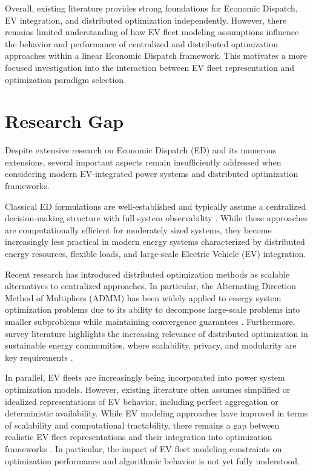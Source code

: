 \documentclass[12pt, a4paper]{article}
\begin{document}
Overall, existing literature provides strong foundations for Economic Dispatch, EV integration, and distributed optimization independently. However, there remains limited understanding of how EV fleet modeling assumptions influence the behavior and performance of centralized and distributed optimization approaches within a linear Economic Dispatch framework. This motivates a more focused investigation into the interaction between EV fleet representation and optimization paradigm selection.
%
\section{Research Gap}
% 
Despite extensive research on Economic Dispatch (ED) and its numerous extensions, several important aspects remain insufficiently addressed when considering modern EV-integrated power systems and distributed optimization frameworks. 

Classical ED formulations are well-established and typically assume a centralized decision-making structure with full 
system observability \parencite{Conejo2010}. While these approaches are computationally efficient for moderately sized systems, they become increasingly less practical in modern energy systems characterized by distributed energy resources, flexible loads, and large-scale Electric Vehicle (EV) integration.

Recent research has introduced distributed optimization methods as scalable alternatives to centralized approaches. In particular, the Alternating Direction Method of Multipliers (ADMM) has been widely applied to energy system optimization problems due to its ability to decompose large-scale problems into smaller subproblems while maintaining convergence guarantees \parencite{Boyd2011, Erseghe2014}. Furthermore, survey literature highlights the increasing relevance of distributed optimization in sustainable energy communities, where scalability, privacy, and modularity are key requirements \parencite{Basaran2026, Sun2025}.

In parallel, EV fleets are increasingly being incorporated into power system optimization models. However, existing literature often assumes simplified or idealized representations of EV behavior, including perfect aggregation or deterministic availability. While EV modeling approaches have improved in terms of scalability and computational tractability, there remains a gap between realistic EV fleet representations and their integration into optimization frameworks \parencite{Muessel2023}. In particular, the impact of EV fleet modeling constraints on optimization performance and algorithmic behavior is not yet fully understood.
\end{document}
